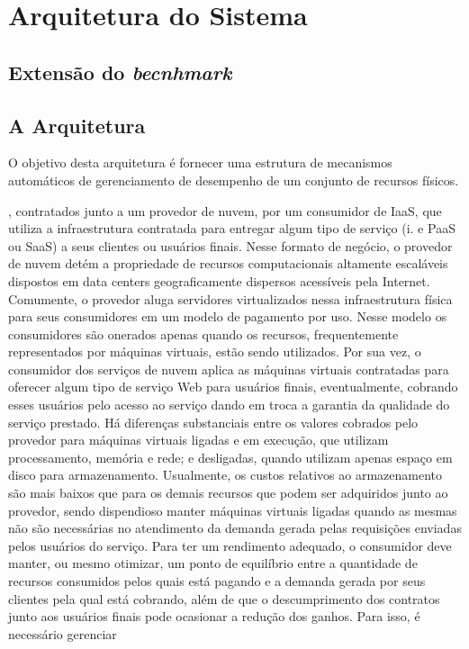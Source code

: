 \section{Arquitetura do Sistema}
\subsection{Extensão do \textit{becnhmark}}
\subsection{A Arquitetura}

O objetivo desta arquitetura é fornecer uma estrutura de mecanismos automáticos de gerenciamento de desempenho de um conjunto de recursos físicos.

, contratados junto
a um provedor de nuvem, por um consumidor de IaaS, que utiliza a infraestrutura contratada para
entregar algum tipo de serviço (i. e PaaS ou SaaS) a seus clientes ou usuários finais.
Nesse formato de negócio, o provedor de nuvem detém a propriedade de recursos computacionais
altamente escaláveis dispostos em data centers geograficamente dispersos acessíveis pela
Internet. Comumente, o provedor aluga servidores virtualizados nessa infraestrutura física para
seus consumidores em um modelo de pagamento por uso. Nesse modelo os consumidores são
onerados apenas quando os recursos, frequentemente representados por máquinas virtuais, estão
sendo utilizados. Por sua vez, o consumidor dos serviços de nuvem aplica as máquinas virtuais
contratadas para oferecer algum tipo de serviço Web para usuários finais, eventualmente, cobrando
esses usuários pelo acesso ao serviço dando em troca a garantia da qualidade do serviço prestado.
Há diferenças substanciais entre os valores cobrados pelo provedor para máquinas virtuais ligadas
e em execução, que utilizam processamento, memória e rede; e desligadas, quando utilizam
apenas espaço em disco para armazenamento. Usualmente, os custos relativos ao armazenamento
são mais baixos que para os demais recursos que podem ser adquiridos junto ao provedor, sendo
dispendioso manter máquinas virtuais ligadas quando as mesmas não são necessárias no atendimento
da demanda gerada pelas requisições enviadas pelos usuários do serviço.
Para ter um rendimento adequado, o consumidor deve manter, ou mesmo otimizar, um ponto
de equilíbrio entre a quantidade de recursos consumidos pelos quais está pagando e a demanda
gerada por seus clientes pela qual está cobrando, além de que o descumprimento dos contratos
junto aos usuários finais pode ocasionar a redução dos ganhos. Para isso, é necessário gerenciar
